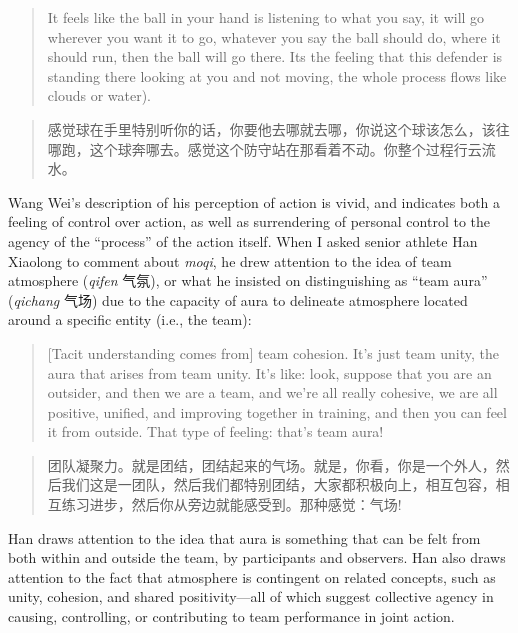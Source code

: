 \begin{CJK}{UTF8}{gbsn}
  \begin{quote}
    It feels like the ball in your hand is listening to what you say, it will go wherever you want it to go, whatever you say the ball should do, where it should run, then the ball will go there.  Its the feeling that this defender is standing there looking at you and not moving, the whole process flows like clouds or water).
  \end{quote}

  \begin{quote}
        感觉球在手里特别听你的话，你要他去哪就去哪，你说这个球该怎么，该往哪跑，这个球奔哪去。感觉这个防守站在那看着不动。你整个过程行云流水。
  \end{quote}

Wang Wei’s description of his perception of action is vivid, and indicates both a feeling of control over action, as well as surrendering of personal control to the agency of the ``process'' of the action itself.  When I asked senior athlete Han Xiaolong to comment about \textit{moqi}, he drew attention to the idea of team atmosphere (\textit{qifen} 气氛), or what he insisted on distinguishing as ``team aura'' (\textit{qichang} 气场) due to the capacity of aura to delineate atmosphere located around a specific entity (i.e., the team):

    \begin{quote}
      [Tacit understanding comes from] team cohesion.  It's just team unity, the aura that arises from team unity.  It's like: look, suppose that you are an outsider, and then we are a team, and we’re all really cohesive, we are all positive, unified, and improving together in training, and then you can feel it from outside.  That type of feeling: that's team aura!
    \end{quote}

    \begin{quote}
      团队凝聚力。就是团结，团结起来的气场。就是，你看，你是一个外人，然后我们这是一团队，然后我们都特别团结，大家都积极向上，相互包容，相互练习进步，然后你从旁边就能感受到。那种感觉：气场!
    \end{quote}

Han draws attention to the idea that aura is something that can be felt from both within and outside the team, by participants and observers.  Han also draws attention to the fact that atmosphere is contingent on related concepts, such as unity, cohesion, and shared positivity---all of which suggest collective agency in causing, controlling, or contributing to team performance in joint action.


\end{CJK}
